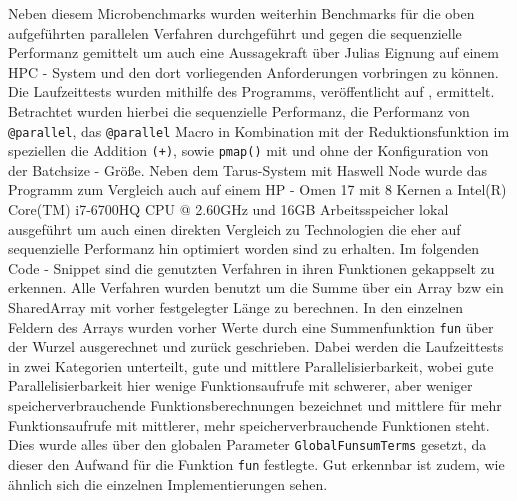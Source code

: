 \documentclass[proseminar,german,utf8]{zihpub}
\begin{document}
Neben diesem Microbenchmarks wurden weiterhin Benchmarks für die oben aufgeführten parallelen Verfahren durchgeführt und gegen die sequenzielle Performanz gemittelt um auch eine Aussagekraft über Julias Eignung auf einem HPC - System und den dort vorliegenden Anforderungen vorbringen zu können. Die Laufzeittests wurden mithilfe des Programms, veröffentlicht auf \cite{JuliaCookbook}, ermittelt. Betrachtet wurden hierbei die sequenzielle Performanz, die Performanz von \verb|@parallel|, das \verb|@parallel| Macro in Kombination mit der Reduktionsfunktion im speziellen die Addition \verb|(+)|, sowie \verb|pmap()| mit und ohne der Konfiguration von der Batchsize - Größe. Neben dem Tarus-System mit Haswell Node wurde das Programm zum Vergleich auch auf einem HP - Omen 17 mit 8 Kernen a Intel(R) Core(TM) i7-6700HQ CPU @ 2.60GHz und 16GB Arbeitsspeicher lokal ausgeführt um auch einen direkten Vergleich zu Technologien die eher auf sequenzielle Performanz hin optimiert worden sind zu erhalten. Im folgenden Code - Snippet sind die genutzten Verfahren in ihren Funktionen gekappselt zu erkennen. Alle Verfahren wurden benutzt um die Summe über ein Array bzw ein SharedArray mit vorher festgelegter Länge zu berechnen. In den einzelnen Feldern des Arrays wurden vorher Werte durch eine Summenfunktion \verb|fun| über der Wurzel ausgerechnet und zurück geschrieben. Dabei werden die Laufzeittests in zwei Kategorien unterteilt, gute und mittlere Parallelisierbarkeit, wobei gute Parallelisierbarkeit hier wenige Funktionsaufrufe mit schwerer, aber weniger speicherverbrauchende Funktionsberechnungen bezeichnet und mittlere für mehr Funktionsaufrufe mit mittlerer, mehr speicherverbrauchende Funktionen steht. Dies wurde alles über den globalen Parameter \verb|GlobalFunsumTerms| gesetzt, da dieser den Aufwand für die Funktion \verb|fun| festlegte. Gut erkennbar ist zudem, wie ähnlich sich die einzelnen Implementierungen sehen. \newpage
\end{document}
